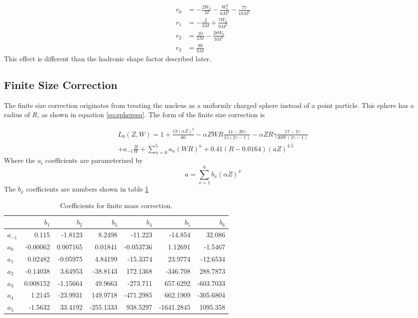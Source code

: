 \documentclass[../MaxHughesThesis.tex]{subfiles}
\begin{document}
\begin{equation}
	\label{eq:finitemassrs}
	\begin{split}
	r_{0} & = -\frac{2W_{0}}{M} - \frac{W_{0}^{2}}{6M^{2}} - \frac{77}{18M^{2}} \\
	r_{1} & = -\frac{2}{3M} + \frac{7W_{0}}{9M^{2}} \\
	r_{2} & = \frac{10}{3M} - \frac{28W_{0}}{9M^{2}} \\
	r_{3} & = \frac{88}{9M}
	\end{split}
\end{equation}
This effect is different than the hadronic shape factor described later. 

\subsection{Finite Size Correction}
The finite size correction originates from treating the nucleus as a uniformly charged sphere instead of a point particle.
This sphere has a radius of $R$, as shown in equation \ref{eq:sphereeq}.
The form of the finite size correction is \cite{WIL90} %

\begin{equation}
	\label{eq:finitesize}
	\begin{split}
	L_{0}(Z,W) = 1 + \frac{13(\alpha Z)^{2}}{60} - \alpha Z W R \frac{41 - 26\gamma}{15(2\gamma - 1)} - \alpha Z R \gamma \frac{17 - 2\gamma}{30W(2\gamma - 1)}  \\
	+ a_{-1} \frac{R}{W} + \sum_{n=0}^{5} a_{n} (W R)^{n} + 0.41(R - 0.0164)(a Z)^{4.5}
	\end{split}
\end{equation}
Where the $a_{i}$ coefficients are parameterized by %
\begin{equation}
	a = \sum_{x = 1}^{6} b_{x} (\alpha Z)^{x}
	\label{eq:A}
\end{equation}
The $b_{x}$ coefficients are numbers shown in table \ref{tab:bcoef}

\begin{table}[!hbt]
	\centering
	\caption{Coefficients for finite mass correction.}
		\begin{tabular}{lrrrrrr}
		         & $b_{1}$ & $b_{2}$ & $b_{3}$ & $b_{4}$ & $b_{5}$ & $b_{6}$ \\ \hline
		$a_{-1}$ & 0.115 & -1.8123 & 8.2498 & -11.223 & -14.854 & 32.086 \\
		$a_{0}$  & -0.00062 & 0.007165 & 0.01841 & -0.053736 & 1.12691 & -1.5467 \\
		$a_{1}$  & 0.02482 & -0.05975 & 4.84199 & -15.3374 & 23.9774 & -12.6534 \\
		$a_{2}$  & -0.14038 & 3.64953 & -38.8143 & 172.1368 & -346.708 & 288.7873 \\
		$a_{3}$  & 0.008152 & -1.15664 & 49.9663 & -273.711 & 657.6292 & -603.7033 \\
		$a_{4}$  & 1.2145 & -23.9931 & 149.9718 & -471.2985 & 662.1909 & -305.6804 \\
		$a_{5}$  & -1.5632 & 33.4192 & -255.1333 & 938.5297 & -1641.2845 & 1095.358 
		\end{tabular}
	\label{tab:bcoef}
\end{table}
\end{document}
